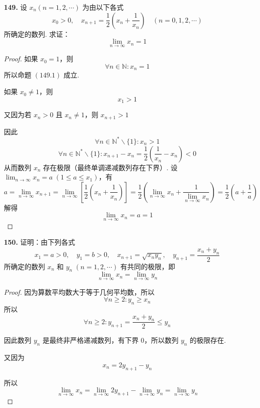 \textbf{149.} 设 $x_n(n=1,2,\cdots)$ 为由以下各式
\[x_0 > 0, \quad x_{n+1} = \frac{1}{2}\left(x_n + \frac{1}{x_n}\right) \quad (n=0,1,2,\cdots)\]
所确定的数列. 求证：
\[\lim_{n \rightarrow \infty} x_n = 1 \tag{149.1}\]
\begin{proof}
    如果 $x_0 = 1$，则
    \[\forall n \in \mathbb{N}: x_n = 1\]
    所以命题 $(149.1)$ 成立.

    如果 $x_0 \neq 1$，则
    \[x_1 > 1\]
    
    又因为若 $x_n > 0$ 且 $x_n \neq 1$，则 $x_{n+1} > 1$

    因此
    \[\forall n \in \mathbb{N}^*\backslash\{1\}: x_n > 1\]
    \[\forall n \in \mathbb{N}^*\backslash\{1\}: x_{n+1} - x_n = \frac{1}{2}\left(\frac{1}{x_n} - x_n\right) < 0\]
    从而数列 $x_n$ 存在极限（最终单调递减数列存在下界）. 设 $\displaystyle \lim_{n \rightarrow \infty} x_n = a \;(1 \leqslant a \leqslant x_1)$，有
    \[a = \lim_{n \rightarrow \infty} x_{n+1} = \lim_{n \rightarrow \infty} \left[\frac{1}{2}\left(x_n + \frac{1}{x_n}\right)\right] = \frac{1}{2} \left( \lim_{n \rightarrow \infty} x_n + \frac{1}{\displaystyle \lim_{n \rightarrow \infty} x_n}\right) = \frac{1}{2}\left(a + \frac{1}{a}\right)\]
    解得
    \[\lim_{n \rightarrow \infty} x_n = a = 1\]
\end{proof}\vspace{9pt}

\textbf{150.} 证明：由下列各式
\[x_1 = a > 0, \quad y_1= b > 0, \quad x_{n+1} = \sqrt{x_ny_n}, \quad y_{n+1} = \frac{x_n + y_n}{2}\]
所确定的数列 $x_n$ 和 $y_n \; (n=1,2,\cdots)$ 有共同的极限，即
\[\lim_{n \rightarrow \infty} x_n = \lim_{n \rightarrow \infty} y_n\]
\begin{proof}
    因为算数平均数大于等于几何平均数，所以
    \[\forall n \geqslant 2: y_n \geqslant x_n\]
    所以
    \[\forall n \geqslant 2: y_{n+1} = \frac{x_n + y_n}{2} \leqslant y_n\]

    因此数列 $y_n$ 是最终非严格递减数列，有下界 0，所以数列 $y_n$ 的极限存在.

    又因为
    \[x_n = 2y_{n+1} - y_n\]

    所以
    \[\lim_{n \rightarrow \infty} x_n = \lim_{n \rightarrow \infty} 2y_{n+1} - \lim_{n \rightarrow \infty} y_n = \lim_{n \rightarrow \infty} y_n\]
\end{proof}\vspace{9pt}

